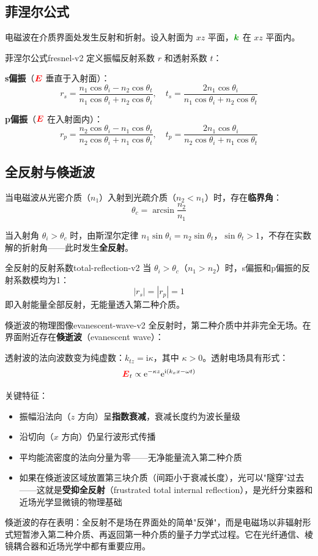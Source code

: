 \documentclass[11pt,a4paper,openany,oneside]{book}
\newcommand{\vecE}{\textcolor{red}{\vect{E}}}
\newcommand{\vecK}{\textcolor{green!60!black}{\vect{k}}}
\newcommand{\ii}{\mathrm{i}}
\newcommand{\ee}{\mathrm{e}}
\newcommand{\vect}[1]{\bm{#1}}
\begin{document}
\subsection{菲涅尔公式}

电磁波在介质界面处发生反射和折射。设入射面为 $xz$ 平面，$\vecK$ 在 $xz$ 平面内。

\begin{theorem}{菲涅尔公式}{fresnel-v2}
定义振幅反射系数 $r$ 和透射系数 $t$：

\textbf{s偏振}（$\vecE$ 垂直于入射面）：
\[
r_s = \frac{n_1\cos\theta_i - n_2\cos\theta_t}{n_1\cos\theta_i + n_2\cos\theta_t}, \quad t_s = \frac{2n_1\cos\theta_i}{n_1\cos\theta_i + n_2\cos\theta_t}
\]

\textbf{p偏振}（$\vecE$ 在入射面内）：
\[
r_p = \frac{n_2\cos\theta_i - n_1\cos\theta_t}{n_2\cos\theta_i + n_1\cos\theta_t}, \quad t_p = \frac{2n_1\cos\theta_i}{n_2\cos\theta_i + n_1\cos\theta_t}
\]
\end{theorem}

\subsection{全反射与倏逝波}

当电磁波从光密介质（$n_1$）入射到光疏介质（$n_2 < n_1$）时，存在\textbf{临界角}：
\[
\theta_c = \arcsin\frac{n_2}{n_1}
\]

当入射角 $\theta_i > \theta_c$ 时，由斯涅尔定律 $n_1\sin\theta_i = n_2\sin\theta_t$，$\sin\theta_t > 1$，不存在实数解的折射角——此时发生\textbf{全反射}。

\begin{theorem}{全反射的反射系数}{total-reflection-v2}
当 $\theta_i > \theta_c$（$n_1 > n_2$）时，s偏振和p偏振的反射系数模均为1：
\[
|r_s| = |r_p| = 1
\]
即入射能量全部反射，无能量透入第二种介质。
\end{theorem}

\begin{insight}{倏逝波的物理图像}{evanescent-wave-v2}
全反射时，第二种介质中并非完全无场。在界面附近存在\textbf{倏逝波}（evanescent wave）：

透射波的法向波数变为纯虚数：$k_{tz} = \ii\kappa$，其中 $\kappa > 0$。透射电场具有形式：
\[
\vecE_t \propto \ee^{-\kappa z}\ee^{\ii(k_x x - \omega t)}
\]

关键特征：
\begin{itemize}
\item 振幅沿法向（$z$ 方向）呈\textbf{指数衰减}，衰减长度约为波长量级
\item 沿切向（$x$ 方向）仍呈行波形式传播
\item 平均能流密度的法向分量为零——无净能量流入第二种介质
\item 如果在倏逝波区域放置第三块介质（间距小于衰减长度），光可以"隧穿"过去——这就是\textbf{受抑全反射}（frustrated total internal reflection），是光纤分束器和近场光学显微镜的物理基础
\end{itemize}

倏逝波的存在表明：全反射不是场在界面处的简单"反弹"，而是电磁场以非辐射形式短暂渗入第二种介质、再返回第一种介质的量子力学式过程。它在光纤通信、棱镜耦合器和近场光学中都有重要应用。
\end{insight}
\end{document}

